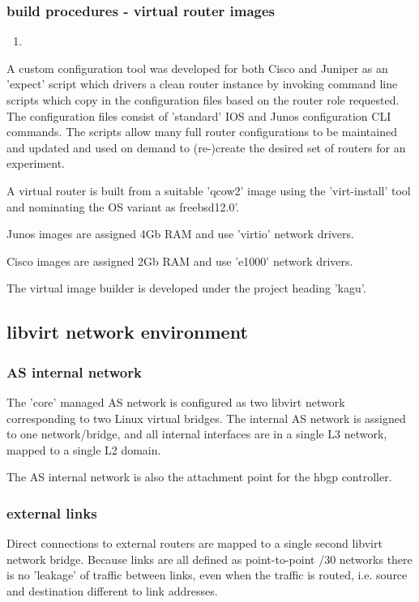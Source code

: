 \subsubsection{build procedures - virtual router images}

\begin{enumerate}
\item <reference source file directory>
\end{enumerate}

A custom configuration tool was developed for both Cisco and Juniper as an 'expect' script which drivers a clean router instance by invoking command line scripts which copy in the configuration files based on the router role requested.  The configuration files consist of 'standard' IOS and Junos configuration CLI commands.
The scripts allow many full router configurations to be maintained and updated and used on demand to (re-)create the desired set of routers for an experiment.

A virtual router is built from a suitable 'qcow2' image using the 'virt-install' tool and nominating the OS variant as freebsd12.0'.

Junos images are assigned 4Gb RAM and use 'virtio' network drivers.

Cisco images are assigned 2Gb RAM and use 'e1000' network drivers.

The virtual image builder is developed under the project heading 'kagu'.

\subsection{libvirt network environment}

\subsubsection{AS internal network}
The 'core' managed AS network is configured as two libvirt network corresponding to two Linux virtual bridges.
The internal AS network is assigned to one network/bridge, and all internal interfaces are in a single L3 network, mapped to a single L2 domain.

The AS internal network is also the attachment point for the hbgp controller.

\subsubsection{external links}
Direct connections to external routers are mapped to a single second libvirt network bridge.  Because links are all defined as point-to-point /30 networks there is no 'leakage' of traffic between links, even when the traffic is routed, i.e. source and destination different to link addresses.

